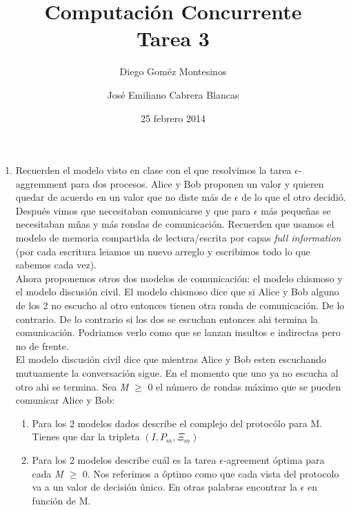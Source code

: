 \documentclass{article}
\title{Computación Concurrente \\ \Large{Tarea 3}}
\author{
  Diego Goméz Montesinos
  \and
  José Emiliano Cabrera Blancas
  }
\date{25 febrero 2014}
\begin{document}
\maketitle
\begin{enumerate}
\item{
    Recuerden el modelo visto en clase con el que resolvimos la tarea
    $\epsilon$-aggremment para dos procesos. Alice y Bob proponen un valor y
    quieren quedar de acuerdo en un valor que no diste más de $\epsilon$ de lo
    que el otro decidió. Después vimos que necesitaban comunicarse y que para 
    $\epsilon$ más pequeñas se necesitaban mñas y más rondas de comunicación.
    Recuerden que usamos el modelo de memoria compartida de lectura/escrita por
    capas \textit{full information} (por cada escritura leiamos un nuevo
    arreglo y escribimos todo lo que sabemos cada vez).\\
    Ahora proponemos otros dos modelos de comunicación: el modelo chismoso y el
    modelo discusión civil. El modelo chismoso dice que si Alice y Bob alguno de
    los 2 no escucho al otro entonces tienen otra ronda de comunicación. De lo 
    contrario. De lo contrario si los dos se escuchan entonces ahi termina la 
    comunicación. Podriamos verlo como que se lanzan insultos e indirectas pero
    no de frente.\\
    El modelo discusión civil dice que mientras Alice y Bob esten escuchando 
    mutuamente la conversación sigue. En el momento que uno ya no escucha al otro
    ahi se termina.
    Sea \textit{M} $≥$ 0 el número de rondas máximo que se pueden comunicar Alice
    y Bob:
      

    \begin{enumerate}
      \item{Para los 2 modelos dados describe el complejo del protocólo para M. 
        Tienes que dar la tripleta $(I,P_m,\Xi_m)$}

      \item{Para los 2 modelos describe cuál es la tarea $\epsilon$-agreement
        óptima para cada \textit{M} $≥$ 0. Nos referimos a óptimo como que cada
        vista del protocolo va a un valor de decisión único. En otras palabras
      encontrar la $\epsilon$ en función de M.}
    \end{enumerate}
  }


\end{enumerate}
\end{document}
